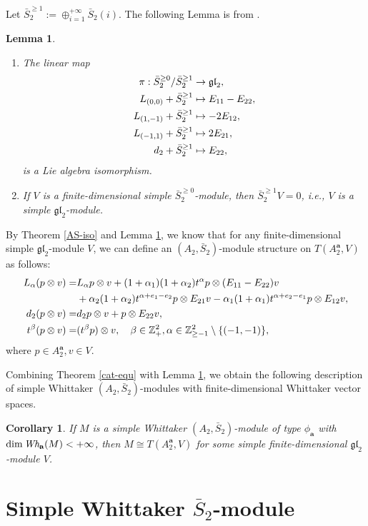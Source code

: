 \documentclass[12pt,a4paper]{amsart}
\newtheorem{Corollary}[Theorem]{Corollary}
\newtheorem{Lemma}[Theorem]{Lemma}
\def\Z{\mathbb{Z}}
\def\ba{\mathbf{a}}
\def\gl{\mathfrak{gl}}
\def\a{\alpha}
\def\be{\beta}
\begin{document}
Let  $\bar{S}_2^{\geq 1}:=\oplus_{i=1}^{+\infty}\bar{S}_2(i)$.
The following Lemma is from \cite{HL1}.

\begin{Lemma}\label{gl2}
\begin{enumerate}
\item The linear map
$$\aligned
\pi : \bar{S}_2^{\geq 0} / \bar{S}_2^{\geq 1}
 &\rightarrow \gl_2,\\
L_{(0,0)}+ \bar{S}_2^{\geq 1} &\mapsto E_{11}-E_{22},\\
L_{(1,-1)}+ \bar{S}_2^{\geq 1} &\mapsto -2E_{12},\\
L_{(-1,1)}+\bar{S}_2^{\geq 1} &\mapsto 2E_{21},\\
d_2+ \bar{S}_2^{\geq 1} &\mapsto E_{22},
 \endaligned$$
is a Lie algebra isomorphism.
\item If $V$ is a finite-dimensional simple $\bar{S}_2^{\geq 0}$-module, then $\bar{S}_2^{\geq 1}V=0$, i.e., $V$ is a simple $\gl_2$-module.
\end{enumerate}
\end{Lemma}

By Theorem \ref{AS-iso} and Lemma \ref{gl2}, we know that for any finite-dimensional simple $\gl_2$-module $V$, we can define an $(A_2,\bar{S}_2)$-module structure on $T(A^{\ba}_2, V)$ as follows:
$$\aligned L_{\a}(p\otimes v) =&
L_{\a} p\otimes v+(1+\a_1)(1+\a_2)t^{\a}p\otimes(E_{11}-E_{22})v\\
&+\a_2(1+\a_2)t^{\a+e_1-e_2}p\otimes E_{21}v-\a_1(1+\a_1)t^{\a+e_2-e_1}p\otimes E_{12}v,\\
d_2(p\otimes v)=&d_2p\otimes v+p\otimes E_{22}v,\\
t^{\be}(p\otimes v)=&(t^{\be}p)\otimes v, \ \ \  \be\in\Z_+^2,\a\in \mathbb{Z}^2_{\geq-1}\setminus\{(-1,-1)\},\endaligned$$
where $p\in  A_2^{\ba}, v\in V$.

Combining Theorem \ref{cat-equ} with Lemma \ref{gl2}, we obtain the following description of simple Whittaker $(A_2,\bar{S}_2)$-modules with finite-dimensional Whittaker vector spaces.



\begin{Corollary}\label{AS-mod}
If $M$ is a simple Whittaker $(A_2, \bar{S}_2)$-module of type $\phi_{\ba}$ with $\dim \emph{Wh}_{\ba}(M) < +\infty$, then $M \cong T(A^{\ba}_2, V)$ for some simple finite-dimensional $\gl_2$-module $V$.
\end{Corollary}


\section{Simple Whittaker $\bar{S}_2$-module}
\end{document}
